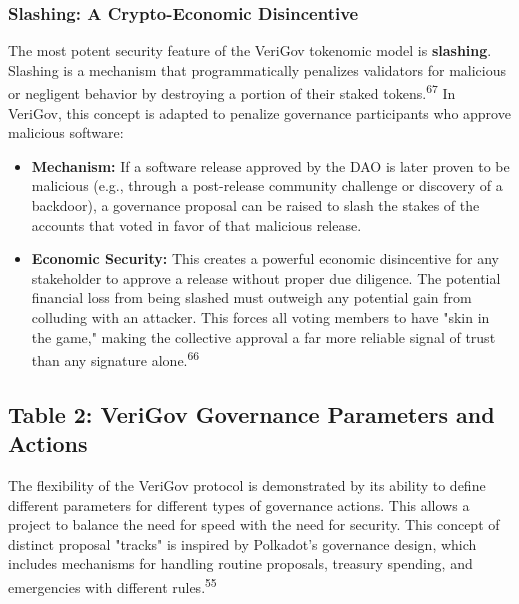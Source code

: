 \documentclass{article}
\begin{document}
\subsubsection{Slashing: A Crypto-Economic Disincentive}

The most potent security feature of the VeriGov tokenomic model is \textbf{slashing}. Slashing is a mechanism that programmatically penalizes validators for malicious or negligent behavior by destroying a portion of their staked tokens.\textsuperscript{67} In VeriGov, this concept is adapted to penalize governance participants who approve malicious software:

\begin{itemize}
\item \textbf{Mechanism:} If a software release approved by the DAO is later proven to be malicious (e.g., through a post-release community challenge or discovery of a backdoor), a governance proposal can be raised to slash the stakes of the accounts that voted in favor of that malicious release.
\item \textbf{Economic Security:} This creates a powerful economic disincentive for any stakeholder to approve a release without proper due diligence. The potential financial loss from being slashed must outweigh any potential gain from colluding with an attacker. This forces all voting members to have "skin in the game," making the collective approval a far more reliable signal of trust than any signature alone.\textsuperscript{66}
\end{itemize}

\subsection{Table 2: VeriGov Governance Parameters and Actions}

The flexibility of the VeriGov protocol is demonstrated by its ability to define different parameters for different types of governance actions. This allows a project to balance the need for speed with the need for security. This concept of distinct proposal "tracks" is inspired by Polkadot's governance design, which includes mechanisms for handling routine proposals, treasury spending, and emergencies with different rules.\textsuperscript{55}
\end{document}
